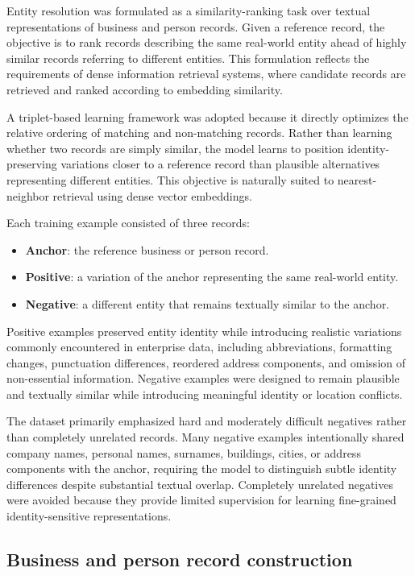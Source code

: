 \documentclass{article}
\begin{document}
Entity resolution was formulated as a similarity-ranking task over textual representations of business and person records. Given a reference record, the objective is to rank records describing the same real-world entity ahead of highly similar records referring to different entities. This formulation reflects the requirements of dense information retrieval systems, where candidate records are retrieved and ranked according to embedding similarity.

A triplet-based learning framework \citep{schroff2015,hoffer2015} was adopted because it directly optimizes the relative ordering of matching and non-matching records. Rather than learning whether two records are simply similar, the model learns to position identity-preserving variations closer to a reference record than plausible alternatives representing different entities. This objective is naturally suited to nearest-neighbor retrieval using dense vector embeddings.

Each training example consisted of three records:
\begin{itemize}
  \item \textbf{Anchor}: the reference business or person record.
  \item \textbf{Positive}: a variation of the anchor representing the same real-world entity.
  \item \textbf{Negative}: a different entity that remains textually similar to the anchor.
\end{itemize}

Positive examples preserved entity identity while introducing realistic variations commonly encountered in enterprise data, including abbreviations, formatting changes, punctuation differences, reordered address components, and omission of non-essential information. Negative examples were designed to remain plausible and textually similar while introducing meaningful identity or location conflicts.

The dataset primarily emphasized hard and moderately difficult negatives rather than completely unrelated records. Many negative examples intentionally shared company names, personal names, surnames, buildings, cities, or address components with the anchor, requiring the model to distinguish subtle identity differences despite substantial textual overlap. Completely unrelated negatives were avoided because they provide limited supervision for learning fine-grained identity-sensitive representations.

\subsection{Business and person record construction}
\end{document}
